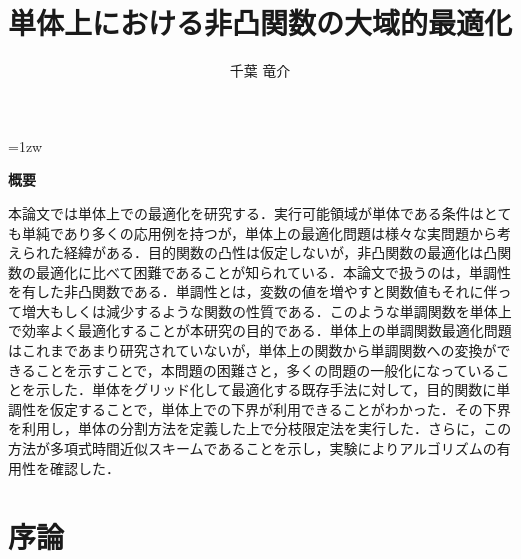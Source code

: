 \documentclass[a4paper,11pt]{jreport}
\title{単体上における非凸関数の大域的最適化}
\author{千葉 竜介}
\begin{document}
\maketitle
\thispagestyle{empty}
\newpage

\thispagestyle{empty}
\vspace*{20pt plus 1fil}
\parindent=1zw
\noindent
\begin{center}
{\bf 概要}
\vspace{5mm}
\end{center}

本論文では単体上での最適化を研究する．実行可能領域が単体である条件はとても単純であり多くの応用例を持つが，単体上の最適化問題は様々な実問題から考えられた経緯がある．目的関数の凸性は仮定しないが，非凸関数の最適化は凸関数の最適化に比べて困難であることが知られている．本論文で扱うのは，単調性を有した非凸関数である．単調性とは，変数の値を増やすと関数値もそれに伴って増大もしくは減少するような関数の性質である．このような単調関数を単体上で効率よく最適化することが本研究の目的である．単体上の単調関数最適化問題はこれまであまり研究されていないが，単体上の関数から単調関数への変換ができることを示すことで，本問題の困難さと，多くの問題の一般化になっていることを示した．単体をグリッド化して最適化する既存手法に対して，目的関数に単調性を仮定することで，単体上での下界が利用できることがわかった．その下界を利用し，単体の分割方法を定義した上で分枝限定法を実行した．さらに，この方法が多項式時間近似スキームであることを示し，実験によりアルゴリズムの有用性を確認した．

\par
\vspace{0pt plus 1fil}
\newpage

\tableofcontents
\listoffigures
\listoftables

\pagebreak
\setcounter{page}{1}

\chapter{序論}
\end{document}

